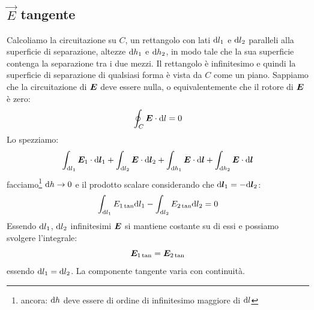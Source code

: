 \subsection{\texorpdfstring{$\vec E$}{E} tangente}
\begin{figure}[htbp]
  \centering
  
\end{figure}
Calcoliamo la circuitazione su $C$, un rettangolo con lati $\mathrm{d} l_1$ e $\mathrm{d} l_2$ paralleli alla superficie di separazione, altezze $\mathrm{d} h_1$ e $\mathrm{d} h_2$, in modo tale che la sua superficie contenga la separazione tra i due mezzi. Il rettangolo è infinitesimo e quindi la superficie di separazione di qualsiasi forma è vista da $C$ come un piano. Sappiamo che la circuitazione di $\boldsymbol{E}$ deve essere nulla, o equivalentemente che il rotore di $\boldsymbol{E}$ è zero:
\begin{equation}
  \oint_C\boldsymbol{E}\cdot \mathrm{d} l=0
\end{equation}
Lo spezziamo:
\begin{equation}
  \int_{\mathrm{d} l_1}\boldsymbol{E}_1\cdot\mathrm{d}\boldsymbol{l}_1+\int_{\mathrm{d} l_2}\boldsymbol{E}\cdot\mathrm{d}\boldsymbol{l}_2+\int_{\mathrm{d} h_1}\boldsymbol{E}\cdot\mathrm{d}\boldsymbol{l}+\int_{\mathrm{d} h_2}\boldsymbol{E}\cdot\mathrm{d}\boldsymbol{l}
\end{equation}
facciamo\footnote{ancora: $\mathrm{d} h$ deve essere di ordine di infinitesimo maggiore di $\mathrm{d} l$} $\mathrm{d} h\to 0$ e il prodotto scalare considerando che $\mathrm{d}\boldsymbol{l}_1=-\mathrm{d}\boldsymbol{l}_2$:
\begin{equation}
  \int_{\mathrm{d} l_1}E_{1\tan}\mathrm{d} l_1-\int_{\mathrm{d} l_2}E_{2\tan}\mathrm{d} l_2=0
\end{equation}
Essendo $\mathrm{d} l_1$, $\mathrm{d} l_2$ infinitesimi $\boldsymbol{E}$ si mantiene costante su di essi e possiamo svolgere l'integrale:
\begin{equation}
  \boldsymbol{E}_{1\tan}=\boldsymbol{E}_{2\tan}
\end{equation}
essendo $\mathrm{d} l_1=\mathrm{d} l_2$. La componente tangente varia con continuità.

